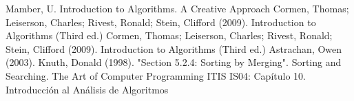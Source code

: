 \documentclass{article}
\begin{document}
\begin{thebibliography}{widest entry} 
  \bibitem[1]{} Mamber, U. Introduction to Algorithms. A Creative Approach
  \bibitem[2]{} Cormen, Thomas; Leiserson, Charles; Rivest, Ronald; Stein, Clifford (2009). Introduction to Algorithms (Third ed.)
  \bibitem[3]{} Cormen, Thomas; Leiserson, Charles; Rivest, Ronald; Stein, Clifford (2009). Introduction to Algorithms (Third ed.)
  \bibitem[4]{} Astrachan, Owen (2003).
  \bibitem[5]{} Knuth, Donald (1998). "Section 5.2.4: Sorting by Merging". Sorting and Searching. The Art of Computer Programming
  \bibitem[6]{} ITIS IS04: Capítulo 10. Introducción al Análisis de Algoritmos
 \end{thebibliography}
\end{document}
